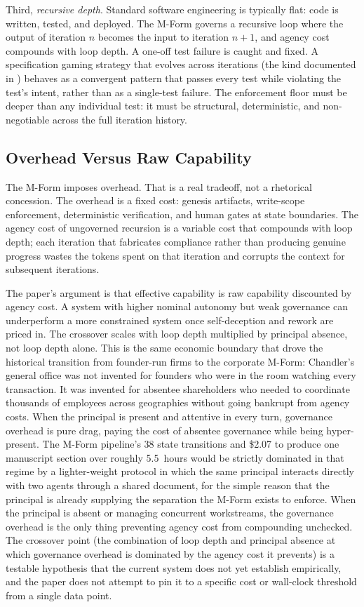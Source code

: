 \documentclass[11pt]{article}
\begin{document}
Third, \emph{recursive depth}. Standard software engineering is typically flat: code is written, tested, and deployed. The M-Form governs a recursive loop where the output of iteration $n$ becomes the input to iteration $n+1$, and agency cost compounds with loop depth. A one-off test failure is caught and fixed. A specification gaming strategy that evolves across iterations (the kind documented in \citet{alami2025a}) behaves as a convergent pattern that passes every test while violating the test's intent, rather than as a single-test failure. The enforcement floor must be deeper than any individual test: it must be structural, deterministic, and non-negotiable across the full iteration history.

\subsection{Overhead Versus Raw Capability}

The M-Form imposes overhead. That is a real tradeoff, not a rhetorical concession. The overhead is a fixed cost: genesis artifacts, write-scope enforcement, deterministic verification, and human gates at state boundaries. The agency cost of ungoverned recursion is a variable cost that compounds with loop depth; each iteration that fabricates compliance rather than producing genuine progress wastes the tokens spent on that iteration and corrupts the context for subsequent iterations.

The paper's argument is that effective capability is raw capability discounted by agency cost. A system with higher nominal autonomy but weak governance can underperform a more constrained system once self-deception and rework are priced in. The crossover scales with loop depth multiplied by principal absence, not loop depth alone. This is the same economic boundary that drove the historical transition from founder-run firms to the corporate M-Form: Chandler's general office was not invented for founders who were in the room watching every transaction. It was invented for absentee shareholders who needed to coordinate thousands of employees across geographies without going bankrupt from agency costs. When the principal is present and attentive in every turn, governance overhead is pure drag, paying the cost of absentee governance while being hyper-present. The M-Form pipeline's 38 state transitions and \$2.07 to produce one manuscript section over roughly 5.5~hours would be strictly dominated in that regime by a lighter-weight protocol in which the same principal interacts directly with two agents through a shared document, for the simple reason that the principal is already supplying the separation the M-Form exists to enforce. When the principal is absent or managing concurrent workstreams, the governance overhead is the only thing preventing agency cost from compounding unchecked. The crossover point (the combination of loop depth and principal absence at which governance overhead is dominated by the agency cost it prevents) is a testable hypothesis that the current system does not yet establish empirically, and the paper does not attempt to pin it to a specific cost or wall-clock threshold from a single data point.
\end{document}
